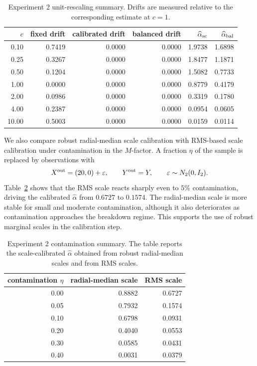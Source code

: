 \documentclass[11pt]{article}
\newcommand{\1}{\mathbf{1}}
\begin{document}
\begin{table}[t]
\centering
\small
\caption{
Experiment 2 unit-rescaling summary.  Drifts are measured relative to the
corresponding estimate at $c=1$.
}
\label{tab:exp2-unit}
\begin{tabular}{rrrrrr}
\toprule
$c$
& fixed drift
& calibrated drift
& balanced drift
& $\widehat\alpha_{\rm sc}$
& $\widehat\alpha_{\rm bal}$ \\
\midrule
0.10 & 0.7419 & 0.0000 & 0.0000 & 1.9738 & 1.6898 \\
0.25 & 0.3267 & 0.0000 & 0.0000 & 1.8477 & 1.1871 \\
0.50 & 0.1204 & 0.0000 & 0.0000 & 1.5082 & 0.7733 \\
1.00 & 0.0000 & 0.0000 & 0.0000 & 0.8779 & 0.4179 \\
2.00 & 0.0986 & 0.0000 & 0.0000 & 0.3319 & 0.1780 \\
4.00 & 0.2387 & 0.0000 & 0.0000 & 0.0954 & 0.0605 \\
10.00 & 0.5003 & 0.0000 & 0.0000 & 0.0159 & 0.0114 \\
\bottomrule
\end{tabular}
\end{table}

We also compare robust radial-median scale calibration with RMS-based scale
calibration under contamination in the $M$-factor.  A fraction $\eta$ of the
sample is replaced by observations with
\[
 X^{\rm out}=(20,0)+\varepsilon,
 \qquad
 Y^{\rm out}=Y,
 \qquad
 \varepsilon\sim N_2(0,I_2).
\]
Table~\ref{tab:exp2-contamination} shows that the RMS scale reacts sharply even
to $5\%$ contamination, driving the calibrated $\widehat\alpha$ from $0.6727$ to
$0.1574$.  The radial-median scale is more stable for small and moderate
contamination, although it also deteriorates as contamination approaches the
breakdown regime.  This supports the use of robust marginal scales in the
calibration step.

\begin{table}[t]
\centering
\small
\caption{
Experiment 2 contamination summary.  The table reports the scale-calibrated
$\widehat\alpha$ obtained from robust radial-median scales and from RMS scales.
}
\label{tab:exp2-contamination}
\begin{tabular}{rrr}
\toprule
contamination $\eta$
& radial-median scale
& RMS scale \\
\midrule
0.00 & 0.8882 & 0.6727 \\
0.05 & 0.7932 & 0.1574 \\
0.10 & 0.6798 & 0.0931 \\
0.20 & 0.4040 & 0.0553 \\
0.30 & 0.0585 & 0.0431 \\
0.40 & 0.0031 & 0.0379 \\
\bottomrule
\end{tabular}
\end{table}
\end{document}

